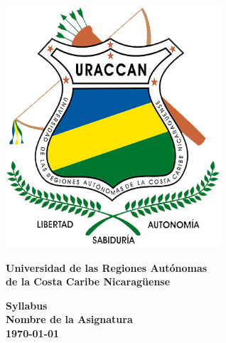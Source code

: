 \begin{titlepage}
    \noindent
    \begin{minipage}{0.2\textwidth}
        \begin{center}
            \includegraphics[width=0.6\textwidth]{images/uraccan_logo.png}
        \end{center}
    \end{minipage}%
    \begin{minipage}{0.8\textwidth}
        \begin{center}
            \Large{\textbf{Universidad de las Regiones Autónomas\\de la Costa Caribe Nicaragüense}}\\
        \end{center}
    \end{minipage}

    \begin{center}
        \vspace{4cm}
        \large{\textbf{Syllabus}}\\

        \vspace{4cm}
        \Huge{\textbf{Nombre de la Asignatura}}\\

        \vfill
        \small{\textbf{\today{}}}\\

    \end{center}
\end{titlepage}
